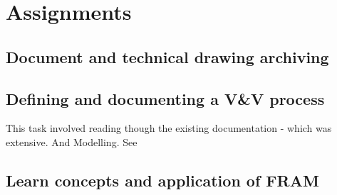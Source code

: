 \chapter{Assignments}

\section{Document and technical drawing archiving}

\section{Defining and documenting a V\&V process}

This task involved reading though the existing documentation - which was extensive. And Modelling. See \cite{Rostgaard_VandV:2011}

\section{Learn concepts and application of FRAM}
